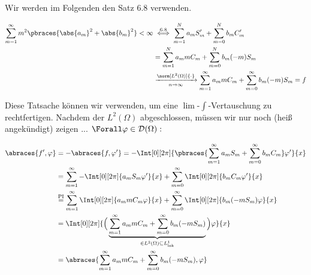 \begin{solution}
\begin{enumerate}[label = (\roman*)]
\begin{enumerate}
\begin{itemize}
      Wir werden im Folgenden den Satz 6.8 verwenden.


      \begin{align*}
        \sum_{m=1}^\infty m^2 \pbraces{\abs{a_m}^2 + \abs{b_m}^2} < \infty
        & \stackrel
        {
          \mathrm{6.8}
        }{\iff}
        \sum_{m=1}^N a_m S_m^\prime + \sum_{m=0}^N b_m C_m^\prime \\
        & =
        \sum_{m=1}^N a_m m C_m + \sum_{m=0}^N b_m (-m) S_m \\
        & \xrightarrow[n \to \infty]{\norm[L^2(\Omega)]{\cdot}}
        \sum_{m=1}^\infty a_m m C_m + \sum_{m=0}^\infty b_m (-m) S_m
        =
        f
      \end{align*}

      Diese Tatsache können wir verwenden, um eine $\lim$-$\int$-Vertauschung zu rechtfertigen.
      Nachdem der $L^2(\Omega)$ abgeschlossen, müssen wir nur noch (heiß angekündigt) zeigen ... $\Forall \varphi \in \mathcal{D}(\Omega):$

      \begin{align*}
        \abraces{f^\prime, \varphi}
        & =
        - \abraces{f, \varphi^\prime}
        =
        - \Int[0][2 \pi]
        {
          \pbraces
          {
            \sum_{m=1}^\infty a_m S_m + \sum_{m=0}^\infty b_m C_m
          }
          \varphi^\prime
        }{x} \\
        & =
        \sum_{m=1}^\infty - \Int[0][2 \pi]{a_m S_m \varphi^\prime}{x}
        +
        \sum_{m=0}^\infty \Int[0][2 \pi]{b_m C_m \varphi^\prime}{x} \\
        & \stackrel
        {
          \mathrm{PI}
        }{=}
        \sum_{m=1}^\infty \Int[0][2 \pi]{a_m m C_m \varphi}{x}
        +
        \sum_{m=0}^\infty \Int[0][2 \pi]{b_m (-m S_m) \varphi}{x} \\
        & =
        \Int[0][2 \pi]
        {
          \Big (
            \underbrace
            {
              \sum_{m=1}^\infty a_m m C_m
              +
              \sum_{m=0}^\infty b_m (-m S_m)
            }_{
              \in L^2(\Omega) \subseteq L^1_\mathrm{lok}
            }
          \Big )
          \varphi
        }{x} \\
        & =
        \abraces
        {
          \sum_{m=1}^\infty a_m m C_m
          +
          \sum_{m=0}^\infty b_m (-m S_m),
          \varphi
        }
      \end{align*}


\end{itemize}
\end{enumerate}
\end{enumerate}
\end{solution}
